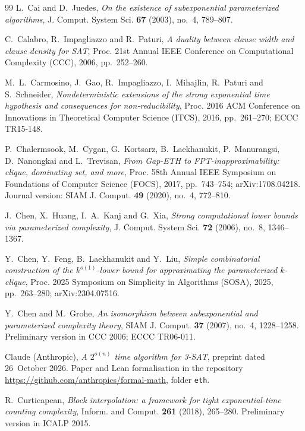 \documentclass[10pt]{amsart}
\theoremstyle{plain}
\theoremstyle{definition}
\theoremstyle{remark}
\numberwithin{equation}{section}
\begin{document}
\begin{thebibliography}{99}
L.~Cai and D.~Juedes, \emph{On the existence of subexponential parameterized algorithms}, J. Comput.
System Sci. \textbf{67} (2003), no.~4, 789--807.

C.~Calabro, R.~Impagliazzo and R.~Paturi, \emph{A duality between clause width and clause density
for {SAT}}, Proc. 21st Annual IEEE Conference on Computational Complexity (CCC), 2006,
pp.~252--260.

M.~L.~Carmosino, J.~Gao, R.~Impagliazzo, I.~Mihajlin, R.~Paturi and S.~Schneider,
\emph{Nondeterministic extensions of the strong exponential time hypothesis and consequences for
non-reducibility}, Proc. 2016 ACM Conference on Innovations in Theoretical Computer Science (ITCS),
2016, pp.~261--270; ECCC TR15-148.

P.~Chalermsook, M.~Cygan, G.~Kortsarz, B.~Laekhanukit, P.~Manurangsi, D.~Nanongkai and L.~Trevisan,
\emph{From {G}ap-{ETH} to {FPT}-inapproximability: clique, dominating set, and more}, Proc. 58th
Annual IEEE Symposium on Foundations of Computer Science (FOCS), 2017, pp.~743--754;
arXiv:1708.04218. Journal version: SIAM J. Comput. \textbf{49} (2020), no.~4, 772--810.

J.~Chen, X.~Huang, I.~A.~Kanj and G.~Xia, \emph{Strong computational lower bounds via parameterized
complexity}, J. Comput. System Sci. \textbf{72} (2006), no.~8, 1346--1367.

Y.~Chen, Y.~Feng, B.~Laekhanukit and Y.~Liu, \emph{Simple combinatorial construction of the
$k^{o(1)}$-lower bound for approximating the parameterized $k$-clique}, Proc. 2025 Symposium on
Simplicity in Algorithms (SOSA), 2025, pp.~263--280; arXiv:2304.07516.

Y.~Chen and M.~Grohe, \emph{An isomorphism between subexponential and parameterized complexity
theory}, SIAM J. Comput. \textbf{37} (2007), no.~4, 1228--1258. Preliminary version in CCC 2006;
ECCC TR06-011.

Claude (Anthropic), \emph{A $2^{o(n)}$ time algorithm for {3-SAT}}, preprint dated 26~October 2026.
Paper and Lean formalisation in the repository \url{https://github.com/anthropics/formal-math},
folder \texttt{eth}.

R.~Curticapean, \emph{Block interpolation: a framework for tight exponential-time counting
complexity}, Inform. and Comput. \textbf{261} (2018), 265--280. Preliminary version in ICALP 2015.


\end{thebibliography}
\end{document}
